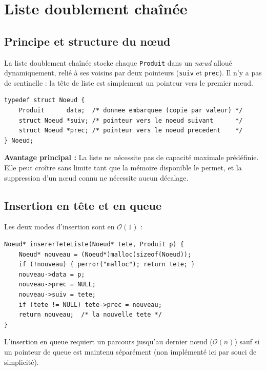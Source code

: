 \documentclass[12pt,a4paper]{report}
\begin{document}
\section{Liste doublement chaînée}

\subsection{Principe et structure du nœud}

La liste doublement chaînée stocke chaque \texttt{Produit} dans un \emph{nœud} alloué dynamiquement, relié à ses voisins par deux pointeurs (\texttt{suiv} et \texttt{prec}). Il n'y a pas de sentinelle : la tête de liste est simplement un pointeur vers le premier nœud.

\begin{lstlisting}[caption={Définition du nœud de la liste doublement chaînée}, label=lst:noeud]
typedef struct Noeud {
    Produit      data;  /* donnee embarquee (copie par valeur) */
    struct Noeud *suiv; /* pointeur vers le noeud suivant      */
    struct Noeud *prec; /* pointeur vers le noeud precedent    */
} Noeud;
\end{lstlisting}

\begin{boiteInfo}
\textbf{Avantage principal :} La liste ne nécessite pas de capacité maximale prédéfinie. Elle peut croître sans limite tant que la mémoire disponible le permet, et la suppression d'un nœud connu ne nécessite aucun décalage.
\end{boiteInfo}

\subsection{Insertion en tête et en queue}

Les deux modes d'insertion sont en $\mathcal{O}(1)$ :

\begin{lstlisting}[caption={Insertion en tête de liste en $\mathcal{O}(1)$}, label=lst:insert_liste]
Noeud* insererTeteListe(Noeud* tete, Produit p) {
    Noeud* nouveau = (Noeud*)malloc(sizeof(Noeud));
    if (!nouveau) { perror("malloc"); return tete; }
    nouveau->data = p;
    nouveau->prec = NULL;
    nouveau->suiv = tete;
    if (tete != NULL) tete->prec = nouveau;
    return nouveau;  /* la nouvelle tete */
}
\end{lstlisting}

L'insertion en queue requiert un parcours jusqu'au dernier nœud ($\mathcal{O}(n)$) sauf si un pointeur de queue est maintenu séparément (non implémenté ici par souci de simplicité).
\end{document}
